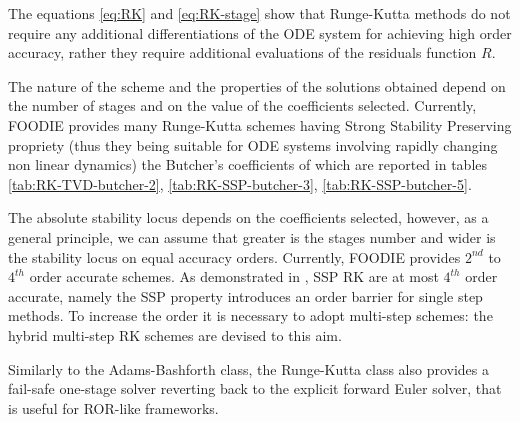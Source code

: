 \begin{table}[!ht]
\caption{Butcher's table for explicit Runge-Kutta schemes}\label{tab:butcher-table}
\centering
{}
\end{table}

The equations \ref{eq:RK} and \ref{eq:RK-stage} show that Runge-Kutta methods do not require any additional differentiations of the ODE system for achieving high order accuracy, rather they require additional evaluations of the residuals function $R$.

The nature of the scheme and the properties of the solutions obtained depend on the number of stages and on the value of the coefficients selected. Currently, FOODIE provides many Runge-Kutta schemes having Strong Stability Preserving propriety (thus they being suitable for ODE systems involving rapidly changing non linear dynamics) the Butcher's coefficients of which are reported in tables \ref{tab:RK-TVD-butcher-2}, \ref{tab:RK-SSP-butcher-3}, \ref{tab:RK-SSP-butcher-5}.

The absolute stability locus depends on the coefficients selected, however, as a general principle, we can assume that greater is the stages number and wider is the stability locus on equal accuracy orders. Currently, FOODIE provides $2^{nd}$ to $4^{th}$ order accurate schemes. As demonstrated in \cite{ketch}, SSP RK are at most $4^{th}$ order accurate, namely the SSP property introduces an order barrier for single step methods. To increase the order it is necessary to adopt multi-step schemes: the hybrid multi-step RK schemes are devised to this aim.

Similarly to the Adams-Bashforth class, the Runge-Kutta class also provides a fail-safe one-stage solver reverting back to the explicit forward Euler solver, that is useful for ROR-like frameworks.


